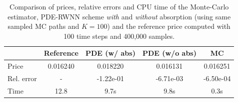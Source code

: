 \begin{table}[hbt!]
    \centering
    \begin{tabular}{l|cccc}
        & Reference & PDE (w/ abs) & PDE (w/o abs) & MC \\
        \hline
        Price & 0.016240 & 0.018220 & 0.016131 & 0.016251 \\
        \hline
        Rel. error & - & -1.22e-01 & -6.71e-03 & -6.50e-04 \\
        \hline
        Time & 12.8 & 9.7s & 9.8s & 0.3s
    \end{tabular}
    \caption{Comparison of prices, relative errors and CPU time of the Monte-Carlo estimator, PDE-RWNN scheme \textit{with} and \textit{without} absorption (using same sampled MC paths and $K = 100$) and the reference price computed with 100 time steps and 400,000 samples.}
    \label{tab:BS_basket_errors}
\end{table}


